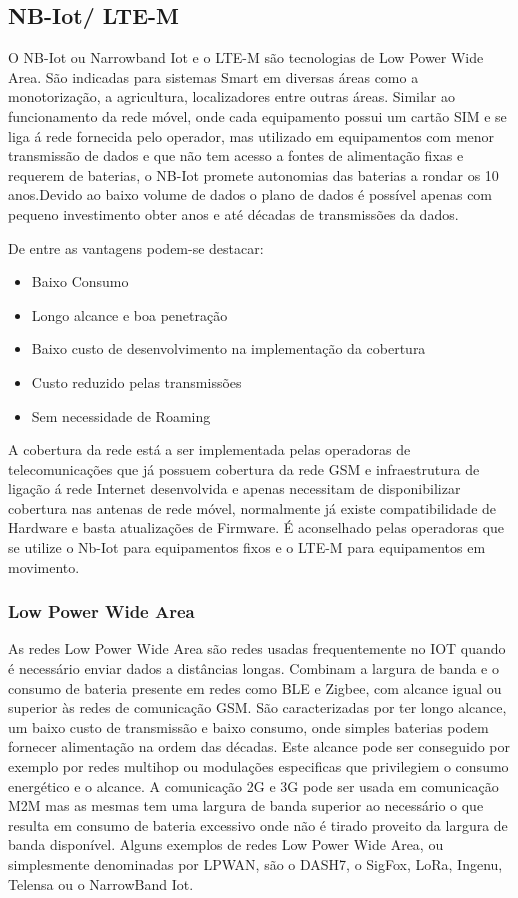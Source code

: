 \subsection {NB-Iot/ LTE-M}
O NB-Iot ou Narrowband Iot  e o LTE-M são tecnologias de Low Power Wide Area. São indicadas para sistemas Smart em diversas áreas como a monotorização, a agricultura, localizadores entre outras áreas. Similar ao funcionamento da rede móvel, onde cada equipamento possui um cartão SIM e se liga á rede fornecida pelo operador, mas utilizado em equipamentos com menor transmissão de dados e que não tem acesso a fontes de alimentação fixas e requerem de baterias, o NB-Iot promete autonomias das baterias a rondar os 10 anos\cite{u_2017}.Devido ao baixo volume de dados o plano de dados é possível apenas com pequeno investimento obter anos e até décadas de transmissões da dados.
\par De entre as vantagens podem-se destacar:
\begin{itemize}
\item Baixo Consumo
\item Longo alcance e boa penetração
\item Baixo custo de desenvolvimento na implementação da cobertura
\item Custo reduzido pelas transmissões
\item Sem necessidade de Roaming
\end{itemize}
\par
A cobertura da rede está a ser implementada pelas operadoras de telecomunicações que já possuem cobertura da rede GSM e infraestrutura de ligação á rede Internet desenvolvida e apenas necessitam de 
disponibilizar cobertura nas antenas de rede móvel, normalmente já existe compatibilidade de Hardware e basta atualizações de Firmware. É aconselhado pelas operadoras que se utilize o Nb-Iot para equipamentos fixos e o LTE-M para equipamentos em movimento.

\subsubsection { Low Power Wide Area}
As redes Low Power Wide Area são redes usadas frequentemente no IOT quando é necessário enviar dados a distâncias longas. Combinam a largura de banda e o consumo de bateria presente em redes como BLE e Zigbee, com alcance igual ou superior às redes de comunicação GSM. São caracterizadas por ter longo alcance, um baixo custo de transmissão e baixo consumo, onde simples baterias podem fornecer alimentação na ordem das décadas. Este alcance pode ser conseguido por exemplo por redes multihop ou modulações especificas que privilegiem o consumo energético e o alcance. A comunicação 2G e 3G pode ser usada em comunicação M2M mas as mesmas tem uma largura de banda superior ao necessário o que resulta em consumo de bateria excessivo onde não é tirado proveito da largura de banda disponível. Alguns exemplos de redes Low Power Wide Area, ou simplesmente denominadas por LPWAN, são o DASH7, o SigFox, LoRa, Ingenu, Telensa ou o NarrowBand Iot.\cite{lpwanoverview}

